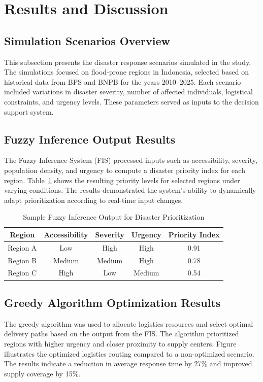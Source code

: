 \documentclass[journal,final,a4paper,twoside,11pt]{IEEEtran}
\begin{document}
\section{Results and Discussion}

\subsection{Simulation Scenarios Overview}
This subsection presents the disaster response scenarios simulated in the study. The simulations focused on flood-prone regions in Indonesia, selected based on historical data from BPS and BNPB for the years 2010–2025. Each scenario included variations in disaster severity, number of affected individuals, logistical constraints, and urgency levels. These parameters served as inputs to the decision support system.

\subsection{Fuzzy Inference Output Results}
The Fuzzy Inference System (FIS) processed inputs such as accessibility, severity, population density, and urgency to compute a disaster priority index for each region. Table~\ref{tab:fuzzyoutput} shows the resulting priority levels for selected regions under varying conditions. The results demonstrated the system’s ability to dynamically adapt prioritization according to real-time input changes.

\begin{table}[htbp]
\caption{Sample Fuzzy Inference Output for Disaster Prioritization}
\begin{center}
\begin{tabular}{|c|c|c|c|c|}
\hline
\textbf{Region} & \textbf{Accessibility} & \textbf{Severity} & \textbf{Urgency} & \textbf{Priority Index} \\
\hline
Region A & Low & High & High & 0.91 \\
Region B & Medium & Medium & High & 0.78 \\
Region C & High & Low & Medium & 0.54 \\
\hline
\end{tabular}
\label{tab:fuzzyoutput}
\end{center}
\end{table}

\subsection{Greedy Algorithm Optimization Results}
The greedy algorithm was used to allocate logistics resources and select optimal delivery paths based on the output from the FIS. The algorithm prioritized regions with higher urgency and closer proximity to supply centers. Figure~ illustrates the optimized logistics routing compared to a non-optimized scenario. The results indicate a reduction in average response time by 27\% and improved supply coverage by 15\%.
\end{document}
